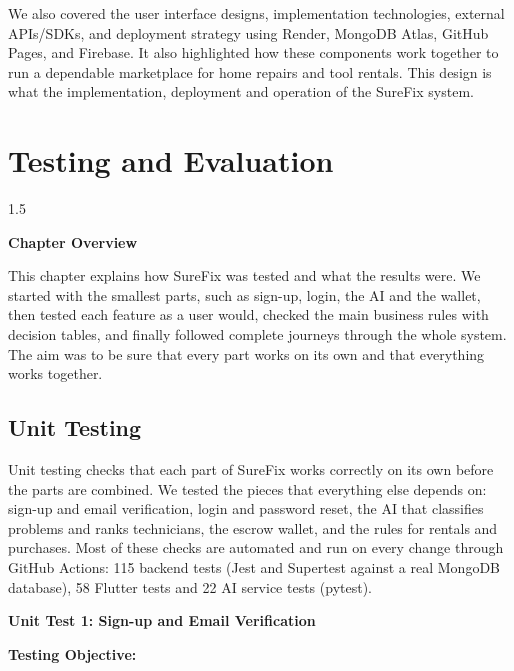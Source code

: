 \documentclass[A4paper,12pt]{report}
\theoremstyle{plain}
\theoremstyle{definition}
\theoremstyle{remark}
\numberwithin{equation}{section}
\begin{document}
We also covered the user interface designs, implementation technologies, external APIs/SDKs, and deployment strategy using Render, MongoDB Atlas, GitHub Pages, and Firebase. It also highlighted how these components work together to run a dependable marketplace for home repairs and tool rentals. This design is what the implementation, deployment and operation of the SureFix system.

\chapter{Testing and Evaluation}
\thispagestyle{empty}
\newpage
\begin{spacing}{1.5}

\thispagestyle{empty}

{\centering \Large \bfseries Chapter Overview \par}
\vspace{1cm} %


This chapter explains how SureFix was tested and what the results were. We started with the smallest parts, such as sign-up, login, the AI and the wallet, then tested each feature as a user would, checked the main business rules with decision tables, and finally followed complete journeys through the whole system. The aim was to be sure that every part works on its own and that everything works together.

\section{Unit Testing}

Unit testing checks that each part of SureFix works correctly on its own before the parts are combined. We tested the pieces that everything else depends on: sign-up and email verification, login and password reset, the AI that classifies problems and ranks technicians, the escrow wallet, and the rules for rentals and purchases. Most of these checks are automated and run on every change through GitHub Actions: 115 backend tests (Jest and Supertest against a real MongoDB database), 58 Flutter tests and 22 AI service tests (pytest).

\textbf{Unit Test 1: Sign-up and Email Verification}

\textbf{Testing Objective:}


\end{spacing}
\end{document}
